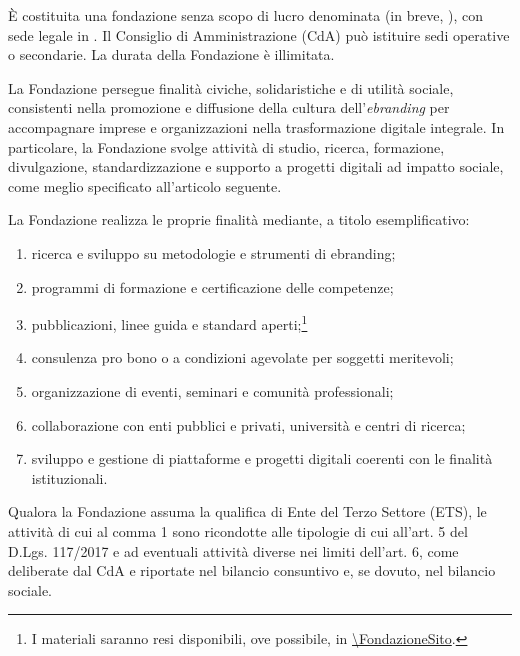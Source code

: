\maketitle

 È costituita una fondazione senza scopo di lucro denominata  (in breve, \FondazioneSigla), con sede legale in . Il Consiglio di Amministrazione (CdA) può istituire sedi operative o secondarie.
 La durata della Fondazione è illimitata.

 La Fondazione persegue finalità civiche, solidaristiche e di utilità sociale, consistenti nella promozione e diffusione della cultura dell'\emph{ebranding} per accompagnare imprese e organizzazioni nella trasformazione digitale integrale.
 In particolare, la Fondazione svolge attività di studio, ricerca, formazione, divulgazione, standardizzazione e supporto a progetti digitali ad impatto sociale, come meglio specificato all'articolo seguente.

 La Fondazione realizza le proprie finalità mediante, a titolo esemplificativo:
\FondazioneAttivita
\begin{enumerate}[label=\alph*)]
  \item ricerca e sviluppo su metodologie e strumenti di ebranding;
  \item programmi di formazione e certificazione delle competenze;
  \item pubblicazioni, linee guida e standard aperti;\footnote{I materiali saranno resi disponibili, ove possibile, in \url{\FondazioneSito}.}
  \item consulenza pro bono o a condizioni agevolate per soggetti meritevoli;
  \item organizzazione di eventi, seminari e comunità professionali;
  \item collaborazione con enti pubblici e privati, università e centri di ricerca;
  \item sviluppo e gestione di piattaforme e progetti digitali coerenti con le finalità istituzionali.
\end{enumerate}
\ifETS
{} Qualora la Fondazione assuma la qualifica di Ente del Terzo Settore (ETS), le attività di cui al comma 1 sono ricondotte alle tipologie di cui all'art. 5 del D.Lgs. 117/2017 e ad eventuali attività diverse nei limiti dell'art. 6, come deliberate dal CdA e riportate nel bilancio consuntivo e, se dovuto, nel bilancio sociale.
\fi

